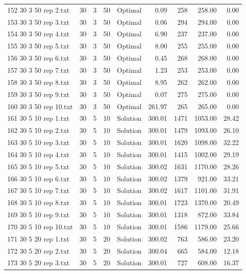 \begin{longtable}{lrrllrrrr}
152 30 3 50 rep 2.txt & 30 & 3 & 50 & Optimal &  0.09 & 258 & 258.00 &  0.00\\
153 30 3 50 rep 3.txt & 30 & 3 & 50 & Optimal &  0.06 & 294 & 294.00 &  0.00\\
154 30 3 50 rep 4.txt & 30 & 3 & 50 & Optimal &  6.90 & 237 & 237.00 &  0.00\\
155 30 3 50 rep 5.txt & 30 & 3 & 50 & Optimal &  8.00 & 255 & 255.00 &  0.00\\
156 30 3 50 rep 6.txt & 30 & 3 & 50 & Optimal &  0.45 & 268 & 268.00 &  0.00\\
157 30 3 50 rep 7.txt & 30 & 3 & 50 & Optimal &  1.23 & 253 & 253.00 &  0.00\\
158 30 3 50 rep 8.txt & 30 & 3 & 50 & Optimal &  8.95 & 262 & 262.00 &  0.00\\
159 30 3 50 rep 9.txt & 30 & 3 & 50 & Optimal &  0.07 & 275 & 275.00 &  0.00\\
160 30 3 50 rep 10.txt & 30 & 3 & 50 & Optimal & 261.97 & 265 & 265.00 &  0.00\\
161 30 5 10 rep 1.txt & 30 & 5 & 10 & Solution & 300.01 & 1471 & 1053.00 & 28.42\\
162 30 5 10 rep 2.txt & 30 & 5 & 10 & Solution & 300.01 & 1479 & 1093.00 & 26.10\\
163 30 5 10 rep 3.txt & 30 & 5 & 10 & Solution & 300.01 & 1620 & 1098.00 & 32.22\\
164 30 5 10 rep 4.txt & 30 & 5 & 10 & Solution & 300.01 & 1415 & 1002.00 & 29.19\\
165 30 5 10 rep 5.txt & 30 & 5 & 10 & Solution & 300.02 & 1631 & 1170.00 & 28.26\\
166 30 5 10 rep 6.txt & 30 & 5 & 10 & Solution & 300.02 & 1379 & 921.00 & 33.21\\
167 30 5 10 rep 7.txt & 30 & 5 & 10 & Solution & 300.02 & 1617 & 1101.00 & 31.91\\
168 30 5 10 rep 8.txt & 30 & 5 & 10 & Solution & 300.01 & 1723 & 1370.00 & 20.49\\
169 30 5 10 rep 9.txt & 30 & 5 & 10 & Solution & 300.01 & 1318 & 872.00 & 33.84\\
170 30 5 10 rep 10.txt & 30 & 5 & 10 & Solution & 300.01 & 1586 & 1179.00 & 25.66\\
171 30 5 20 rep 1.txt & 30 & 5 & 20 & Solution & 300.02 & 763 & 586.00 & 23.20\\
172 30 5 20 rep 2.txt & 30 & 5 & 20 & Solution & 300.04 & 665 & 584.00 & 12.18\\
173 30 5 20 rep 3.txt & 30 & 5 & 20 & Solution & 300.01 & 727 & 608.00 & 16.37\\

\end{longtable}
